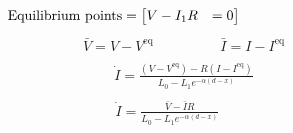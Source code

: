     \begin{align}\nonumber
    \text{ Equilibrium points} &=
        \begin{bmatrix}
            {V - I_1R} &= 0
        \end{bmatrix} \hspace{2.8cm}
    \end{align}
    \begin{align}\nonumber
        \bar{V} = V - V^\text{eq} \hspace{2cm} \bar{I} = I - I^\text{eq}\\ \nonumber
    \end{align}
     \begin{align}\nonumber
        \dot{I} = \frac{(V - V^\text{eq}) - R(I - I^\text{eq})}{L_0 - L_1 e^{-\alpha(d - x)}} \\ \nonumber
    \end{align}
    \begin{align}\nonumber
        \dot{I} = \frac{\bar{V} - \bar{I}R}{L_0 - L_1 e^{-\alpha(d - x)}}\hspace{1cm} \\ \nonumber 
    \end{align}